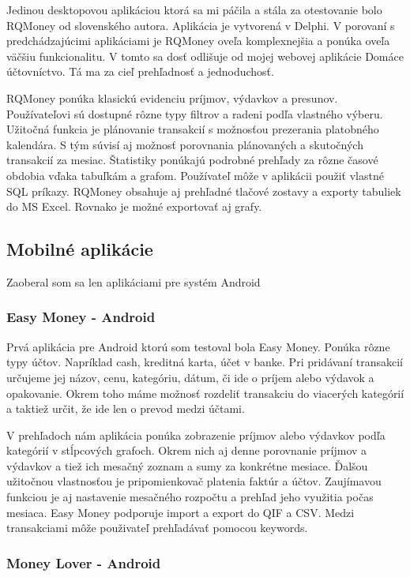 \documentclass[12pt,oneside]{book}
\begin{document}
Jedinou desktopovou aplikáciou ktorá sa mi páčila a stála za otestovanie bolo RQMoney od slovenského autora. Aplikácia je vytvorená v Delphi. V porovaní s predchádzajúcimi aplikáciami je RQMoney oveľa komplexnejšia a ponúka oveľa väčšiu funkcionalitu. V tomto sa dosť odlišuje od mojej webovej aplikácie Domáce účtovníctvo. Tá ma za cieľ prehľadnosť a jednoduchosť. 

RQMoney ponúka klasickú evidenciu príjmov, výdavkov a presunov. Používateľovi sú dostupné rôzne typy filtrov a radeni podľa vlastného výberu. Užitočná funkcia je plánovanie transakcií s možnosťou prezerania platobného kalendára. S tým súvisí aj možnosť porovnania plánovaných a skutočných transakcií za mesiac. Štatistiky ponúkajú podrobné prehľady za rôzne časové obdobia vďaka tabuľkám a grafom. Používateľ môže v aplikácii použiť vlastné SQL príkazy. RQMoney obsahuje aj prehľadné tlačové zostavy a exporty tabuliek do MS Excel. Rovnako je možné exportovať aj grafy. 

\subsection{Mobilné aplikácie}
Zaoberal som sa len aplikáciami pre systém Android
\subsubsection{Easy Money - Android \cite{EasyMoney}\ }

Prvá aplikácia pre Android ktorú som testoval bola Easy Money. Ponúka rôzne typy účtov. Napríklad cash, kreditná karta, účet v banke. Pri pridávaní transakcií určujeme jej názov, cenu, kategóriu, dátum, či ide o príjem alebo výdavok a opakovanie. Okrem toho máme možnosť rozdeliť transakciu do viacerých kategórií a taktiež určit, že ide len o prevod medzi účtami. 

V prehľadoch nám aplikácia ponúka zobrazenie príjmov alebo výdavkov podľa kategórií v stĺpcových grafoch. Okrem nich aj denne porovnanie príjmov a výdavkov a tiež ich mesačný zoznam a sumy za konkrétne mesiace. Ďalšou užitočnou vlastnosťou je pripomienkovač platenia faktúr a účtov. Zaujímavou funkciou je aj nastavenie mesačného rozpočtu a prehľad jeho využitia počas mesiaca. Easy Money podporuje import a export do QIF a CSV.  Medzi transakciami môže použivateľ prehľadávať pomocou keywords.

\subsubsection{Money Lover - Android \cite{MoneyLover}\ }
\end{document}

